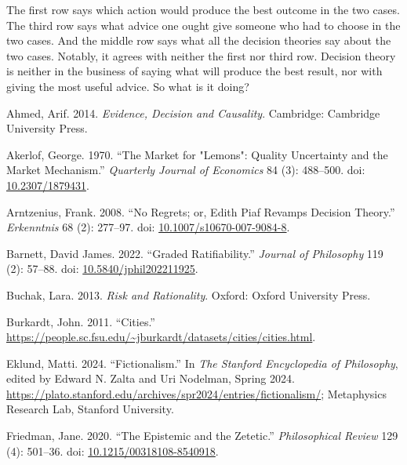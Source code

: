 \documentclass[
  11pt,
  letterpaper,
  DIV=11,
  numbers=noendperiod,
  twoside]{scrartcl}
\newlength{\cslhangindent}
\newenvironment{CSLReferences}[2] %
 {\begin{list}{}{%
  \setlength{\itemindent}{0pt}
  \setlength{\leftmargin}{0pt}
  \setlength{\parsep}{0pt}
  \ifodd #1
   \setlength{\leftmargin}{\cslhangindent}
   \setlength{\itemindent}{-1\cslhangindent}
  \fi
  \setlength{\itemsep}{#2\baselineskip}}}
 {\end{list}}
\begin{document}
The first row says which action would produce the best outcome in the
two cases. The third row says what advice one ought give someone who had
to choose in the two cases. And the middle row says what all the
decision theories say about the two cases. Notably, it agrees with
neither the first nor third row. Decision theory is neither in the
business of saying what will produce the best result, nor with giving
the most useful advice. So what is it doing?

\label{refs}
\begin{CSLReferences}{1}{0}
Ahmed, Arif. 2014. \emph{Evidence, Decision and Causality}. Cambridge:
{C}ambridge {U}niversity {P}ress.

Akerlof, George. 1970. {``The Market for "Lemons": Quality Uncertainty
and the Market Mechanism.''} \emph{Quarterly Journal of Economics} 84
(3): 488--500. doi:
\href{https://doi.org/10.2307/1879431}{10.2307/1879431}.

Arntzenius, Frank. 2008. {``No Regrets; or, Edith Piaf Revamps Decision
Theory.''} \emph{Erkenntnis} 68 (2): 277--97. doi:
\href{https://doi.org/10.1007/s10670-007-9084-8}{10.1007/s10670-007-9084-8}.

Barnett, David James. 2022. {``Graded Ratifiability.''} \emph{Journal of
Philosophy} 119 (2): 57--88. doi:
\href{https://doi.org/10.5840/jphil202211925}{10.5840/jphil202211925}.

Buchak, Lara. 2013. \emph{Risk and Rationality}. Oxford: Oxford
University Press.

Burkardt, John. 2011. {``Cities.''}
\url{https://people.sc.fsu.edu/~jburkardt/datasets/cities/cities.html}.

Eklund, Matti. 2024. {``{Fictionalism}.''} In \emph{The {Stanford}
Encyclopedia of Philosophy}, edited by Edward N. Zalta and Uri Nodelman,
{S}pring 2024.
\url{https://plato.stanford.edu/archives/spr2024/entries/fictionalism/};
Metaphysics Research Lab, Stanford University.

Friedman, Jane. 2020. {``The Epistemic and the Zetetic.''}
\emph{Philosophical Review} 129 (4): 501--36. doi:
\href{https://doi.org/10.1215/00318108-8540918}{10.1215/00318108-8540918}.


\end{CSLReferences}
\end{document}
